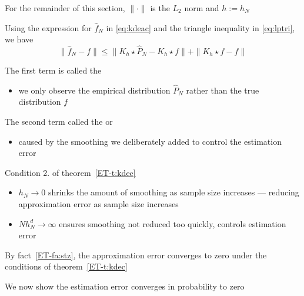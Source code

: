 \begin{frame}
    
    \vspace{2em}
    For the remainder of this
    section, $\| \cdot \|$ is the $L_2$ norm and $h := h_N$
    
    Using the expression
    for $\hat f_N$ in \eqref{eq:kdeac} and the triangle inequality in
    \eqref{eq:lptri}, we have
    \begin{equation}
        \label{eq:dnpk}
        \| \hat f_N - f \|
        \leq \| K_h \star \hat P_N - K_h \star f \| + \| K_h \star f - f \|
    \end{equation}

    \vspace{.7em}
    The first term is called the 
    \begin{itemize}
        \item  we only observe the empirical distribution
        $\hat P_N$ rather than the true distribution $f$
    \end{itemize}
    
    The second term called the  or 
    \begin{itemize}
        \item  caused
        by the smoothing we deliberately added to control the estimation error
    \end{itemize}
    
\end{frame}

\begin{frame}

    \vspace{2em}
    Condition 2. of theorem~\ref{ET-t:kdec}
    \begin{itemize}
        \item  $h_N \to 0$ shrinks the amount of smoothing as sample size 
                increases --- reducing approximation error as sample size increases
        \item $Nh_N^d \to \infty$ ensures smoothing not reduced too quickly, 
                controls estimation error

    \end{itemize}
    
    
    By fact~\ref{ET-fa:stz}, the approximation error converges to zero
    under the conditions of theorem~\ref{ET-t:kdec}
    
    We now show the estimation error converges in probability to zero
    
\end{frame}

